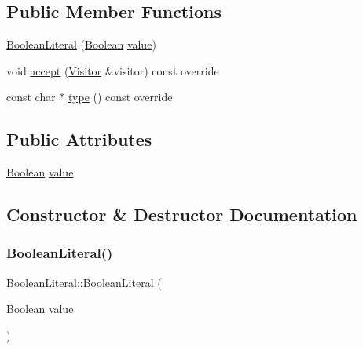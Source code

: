 \subsection*{Public Member Functions}
\begin{DoxyCompactItemize}
\item 
\hyperlink{struct_boolean_literal_a62943a1e1523297b1ea0372d1a5fbbfb}{Boolean\+Literal} (\hyperlink{struct_boolean}{Boolean} \hyperlink{struct_boolean_literal_af74f8eba8c2ea30656de4c4919f5778d}{value})
\item 
void \hyperlink{struct_boolean_literal_aeb7a30e2b22ac6ad12723da1e72087c5}{accept} (\hyperlink{struct_visitor}{Visitor} \&visitor) const override
\item 
const char $\ast$ \hyperlink{struct_boolean_literal_aa10a3ecbeefe15607c3ac43ed63ba8da}{type} () const override
\end{DoxyCompactItemize}
\subsection*{Public Attributes}
\begin{DoxyCompactItemize}
\item 
\hyperlink{struct_boolean}{Boolean} \hyperlink{struct_boolean_literal_af74f8eba8c2ea30656de4c4919f5778d}{value}
\end{DoxyCompactItemize}


\subsection{Constructor \& Destructor Documentation}
\mbox{\label{struct_boolean_literal_a62943a1e1523297b1ea0372d1a5fbbfb}} 
\subsubsection{\texorpdfstring{Boolean\+Literal()}{BooleanLiteral()}}
{\footnotesize\ttfamily Boolean\+Literal\+::\+Boolean\+Literal (\begin{DoxyParamCaption}\item[{\hyperlink{struct_boolean}{Boolean}}]{value }\end{DoxyParamCaption})\hspace{0.3cm}{\ttfamily [inline]}}



